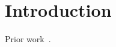 \documentclass{article}
\begin{document}
\begin{abstract}We study codes.\end{abstract}
\section{Introduction}Prior work~\cite{a}.
\end{document}
